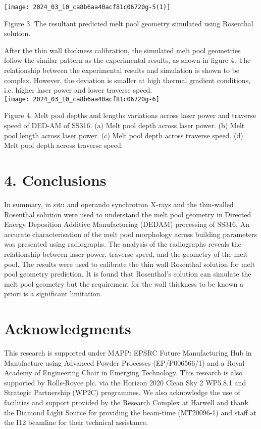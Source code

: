 \documentclass[10pt]{article}
\begin{document}
\begin{center}
\texttt{[image: 2024\_03\_10\_ca8b6aa40acf81c06720g-5(1)]}
\end{center}

Figure 3. The resultant predicted melt pool geometry simulated using Rosenthal solution.

After the thin wall thickness calibration, the simulated melt pool geometries follow the similar pattern as the experimental results, as shown in figure 4. The relationship between the experimental results and simulation is shown to be complex. However, the deviation is smaller at high thermal gradient conditions, i.e. higher laser power and lower traverse speed.\\
\texttt{[image: 2024\_03\_10\_ca8b6aa40acf81c06720g-6]}

Figure 4. Melt pool depths and lengths variations across laser power and traverse speed of DED-AM of SS316. (a) Melt pool depth across laser power. (b) Melt pool length across laser power. (c) Melt pool depth across traverse speed. (d) Melt pool depth across traverse speed.

\section*{4. Conclusions}
In summary, in situ and operando synchrotron X-rays and the thin-walled Rosenthal solution were used to understand the melt pool geometry in Directed Energy Deposition Additive Manufacturing (DEDAM) processing of SS316. An accurate characterisation of the melt pool morphology across building parameters was presented using radiographs. The analysis of the radiographs reveals the relationship between laser power, traverse speed, and the geometry of the melt pool. The results were used to calibrate the thin wall Rosenthal solution for melt pool geometry prediction. It is found that Rosenthal's solution can simulate the melt pool geometry but the requirement for the wall thickness to be known a priori is a significant limitation.

\section*{Acknowledgments}
This research is supported under MAPP: EPSRC Future Manufacturing Hub in Manufacture using Advanced Powder Processes (EP/P006566/1) and a Royal Academy of Engineering Chair in Emerging Technology. This research is also supported by Rolls-Royce plc. via the Horizon 2020 Clean Sky 2 WP5.8.1 and Strategic Partnership (WP2C) programmes. We also acknowledge the use of facilities and support provided by the Research Complex at Harwell and thank the Diamond Light Source for providing the beam-time (MT20096-1) and staff at the I12 beamline for their technical assistance.
\end{document}
